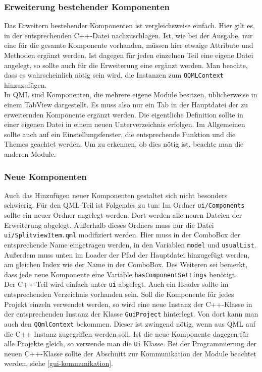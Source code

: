 \subsubsection{Erweiterung bestehender Komponenten}
Das Erweitern bestehender Komponenten ist vergleichsweise einfach. Hier gilt es,
in der entsprechenden C++-Datei nachzuschlagen. Ist, wie bei der Ausgabe, nur
eine für die gesamte Komponente vorhanden, müssen hier etwaige Attribute und
Methoden ergänzt werden. Ist dagegen für jeden einzelnen Teil eine eigene Datei
angelegt, so sollte auch für die Erweiterung eine ergänzt werden. Man beachte,
dass es wahrscheinlich nötig sein wird, die Instanzen zum \texttt{QQMLContext}
hinzuzufügen.\\
In QML sind Komponenten, die mehrere eigene Module besitzen, üblicherweise in
einem TabView dargestellt. Es muss also nur ein Tab in der Hauptdatei der zu
erweiternden Komponente ergänzt werden. Die eigentliche Definition sollte in
einer eigenen Datei in einem neuen Unterverzeichnis erfolgen. Im Allgemeinen
sollte auch auf ein Einstellungsfenster, die entsprechende Funktion und die
Themes geachtet werden. Um zu erkennen, ob dies nötig ist, beachte man die
anderen Module.

\subsubsection{Neue Komponenten}

Auch das Hinzufügen neuer Komponenten gestaltet sich nicht besonders schwierig.
Für den QML-Teil ist Folgendes zu tun: Im Ordner \texttt{ui/Components} sollte ein
neuer Ordner angelegt werden. Dort werden alle neuen Dateien der Erweiterung
abgelegt. Außerhalb dieses Ordners muss nur die Datei
\texttt{ui/SplitviewItem.qml} modifiziert werden. Hier muss in der ComboBox der
entsprechende Name eingetragen werden, in den Variablen \texttt{model} und
\texttt{usualList}. Außerdem muss unten im Loader der Pfad der Hauptdatei
hinzugefügt werden, am gleichen Index wie der Name in der ComboBox. Des Weiteren
sei bemerkt, dass jede neue Komponente eine Variable
\texttt{hasComponentSettings} benötigt.\\
Der C++-Teil wird einfach unter \texttt{ui} abgelegt. Auch ein Header sollte im
entsprechenden Verzeichnis vorhanden sein. Soll die Komponente für jedes Projekt
einzeln verwendet werden, so wird eine neue Instanz der C++-Klasse in der
entsprechenden Instanz der Klasse \texttt{GuiProject} hinterlegt. Von dort kann
man auch den \texttt{QQmlContext} bekommen. Dieser ist zwingend nötig, wenn aus
QML auf die C++ Instanz zugegriffen werden soll. Ist die neue Komponente dagegen
für alle Projekte gleich, so verwende man die \texttt{Ui} Klasse. Bei der
Programmierung der neuen C++-Klasse sollte der Abschnitt zur Kommunikation der
Module beachtet werden, siehe \autoref{gui-kommunikation}.

